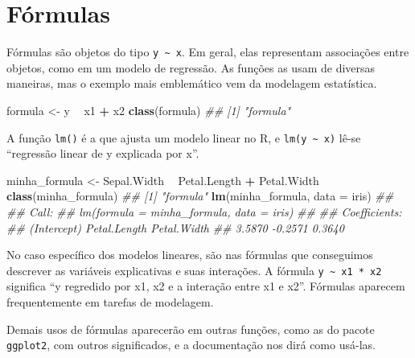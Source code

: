 \documentclass[]{book}
\newenvironment{Shaded}{\begin{snugshade}}{\end{snugshade}}
\newcommand{\CommentTok}[1]{\textcolor[rgb]{0.56,0.35,0.01}{\textit{#1}}}
\newcommand{\DataTypeTok}[1]{\textcolor[rgb]{0.13,0.29,0.53}{#1}}
\newcommand{\KeywordTok}[1]{\textcolor[rgb]{0.13,0.29,0.53}{\textbf{#1}}}
\newcommand{\NormalTok}[1]{#1}
\newcommand{\OperatorTok}[1]{\textcolor[rgb]{0.81,0.36,0.00}{\textbf{#1}}}
\newcommand{\StringTok}[1]{\textcolor[rgb]{0.31,0.60,0.02}{#1}}
\begin{document}
\hypertarget{fuxf3rmulas}{%
\section{Fórmulas}\label{fuxf3rmulas}}

Fórmulas são objetos do tipo \texttt{y\ \textasciitilde{}\ x}. Em geral, elas representam associações entre objetos, como em um modelo de regressão. As funções as usam de diversas maneiras, mas o exemplo mais emblemático vem da modelagem estatística.

\begin{Shaded}
\begin{Highlighting}[]
\NormalTok{formula <-}\StringTok{ }\NormalTok{y }\OperatorTok{~}\StringTok{ }\NormalTok{x1 }\OperatorTok{+}\StringTok{ }\NormalTok{x2}
\KeywordTok{class}\NormalTok{(formula)}
\CommentTok{## [1] "formula"}
\end{Highlighting}
\end{Shaded}

A função \texttt{lm()} é a que ajusta um modelo linear no R, e \texttt{lm(y\ \textasciitilde{}\ x)} lê-se ``regressão linear de y explicada por x''.

\begin{Shaded}
\begin{Highlighting}[]
\NormalTok{minha_formula <-}\StringTok{ }\NormalTok{Sepal.Width }\OperatorTok{~}\StringTok{ }\NormalTok{Petal.Length }\OperatorTok{+}\StringTok{ }\NormalTok{Petal.Width}
\KeywordTok{class}\NormalTok{(minha_formula)}
\CommentTok{## [1] "formula"}
\KeywordTok{lm}\NormalTok{(minha_formula, }\DataTypeTok{data =}\NormalTok{ iris)}
\CommentTok{## }
\CommentTok{## Call:}
\CommentTok{## lm(formula = minha_formula, data = iris)}
\CommentTok{## }
\CommentTok{## Coefficients:}
\CommentTok{##  (Intercept)  Petal.Length   Petal.Width  }
\CommentTok{##       3.5870       -0.2571        0.3640}
\end{Highlighting}
\end{Shaded}

No caso específico dos modelos lineares, são nas fórmulas que conseguimos descrever as variáveis explicativas e suas interações. A fórmula \texttt{y\ \textasciitilde{}\ x1\ *\ x2} significa ``y regredido por x1, x2 e a interação entre x1 e x2''. Fórmulas aparecem frequentemente em tarefas de modelagem.

Demais usos de fórmulas aparecerão em outras funções, como as do pacote \texttt{ggplot2}, com outros significados, e a documentação nos dirá como usá-las.
\end{document}
